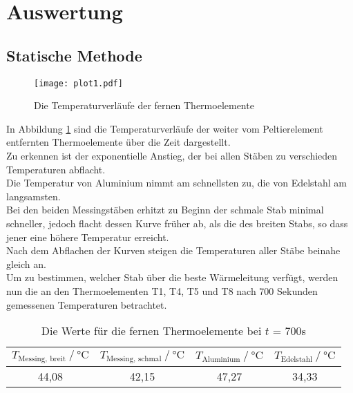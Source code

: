 \section{Auswertung}
\label{sec:Auswertung}

\subsection{Statische Methode}
\label{Statische Methode}

\begin{figure}[H]
  \centering
  \texttt{[image: plot1.pdf]}
  \caption{Die Temperaturverläufe der fernen Thermoelemente}
  \label{fig:plot1}
\end{figure}

In Abbildung \ref{fig:plot1} sind die Temperaturverläufe der
weiter vom Peltierelement entfernten Thermoelemente über die Zeit 
dargestellt.\\
Zu erkennen ist der exponentielle Anstieg, der bei allen Stäben zu verschieden Temperaturen 
abflacht. \\
Die Temperatur von Aluminium nimmt am schnellsten zu, die von Edelstahl am langsamsten.\\
Bei den beiden Messingstäben erhitzt zu Beginn der schmale Stab minimal schneller, 
jedoch flacht dessen Kurve früher ab, als die des breiten Stabs, so dass jener eine höhere 
Temperatur erreicht.\\
Nach dem Abflachen der Kurven steigen die Temperaturen aller Stäbe beinahe gleich an.\\

Um zu bestimmen, welcher Stab über die beste Wärmeleitung 
verfügt, werden nun die an den Thermoelementen T1, T4, T5 und T8 nach 700 Sekunden
gemessenen Temperaturen betrachtet.

\begin{table}[H]
  \centering
  \caption{Die Werte für die fernen Thermoelemente bei $t$ = 700s}
  \begin{tabular}{cccc}
    \toprule
    {$T_{\textrm{Messing, breit}} \mathbin{/} \unit{\degreeCelsius}$} &
    {$T_{\textrm{Messing, schmal}} \mathbin{/} \unit{\degreeCelsius}$} &    %
    {$T_{\textrm{Aluminium}} \mathbin{/} \unit{\degreeCelsius}$} &
    {$T_{\textrm{Edelstahl}} \mathbin{/} \unit{\degreeCelsius}$} \\
    \midrule
    44,08 & 42,15 & 47,27 & 34,33 \\   
    \bottomrule
  \end{tabular}
  \label{tab:TabelleA1}
\end{table}

